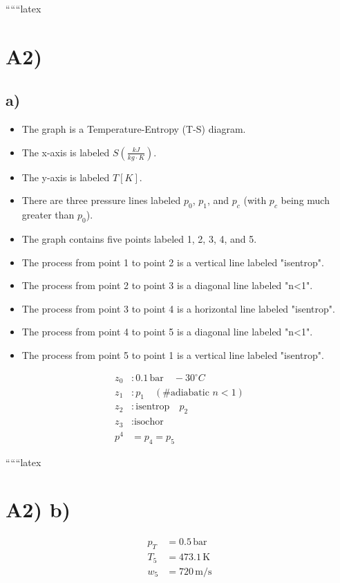 
``````latex


\section*{A2)}

\subsection*{a)}

\begin{itemize}
    \item The graph is a Temperature-Entropy (T-S) diagram.
    \item The x-axis is labeled $S \left( \frac{kJ}{kg \cdot K} \right)$.
    \item The y-axis is labeled $T [K]$.
    \item There are three pressure lines labeled $p_0$, $p_1$, and $p_c$ (with $p_c$ being much greater than $p_0$).
    \item The graph contains five points labeled 1, 2, 3, 4, and 5.
    \item The process from point 1 to point 2 is a vertical line labeled "isentrop".
    \item The process from point 2 to point 3 is a diagonal line labeled "n<1".
    \item The process from point 3 to point 4 is a horizontal line labeled "isentrop".
    \item The process from point 4 to point 5 is a diagonal line labeled "n<1".
    \item The process from point 5 to point 1 is a vertical line labeled "isentrop".
\end{itemize}

\begin{align*}
    z_0 &: 0.1 \, \text{bar} \quad -30^\circ C \\
    z_1 &: p_1 \quad (\text{\# adiabatic } n<1) \\
    z_2 &: \text{isentrop} \quad p_2 \\
    z_3 &: \text{isochor} \\
    p^4 &= p_4 = p_5
\end{align*}

``````latex

\section*{A2) b)}

\begin{align*}
p_T &= 0.5 \, \text{bar} \\
T_5 &= 473.1 \, \text{K} \\
w_5 &= 720 \, \text{m/s}
\end{align*}

